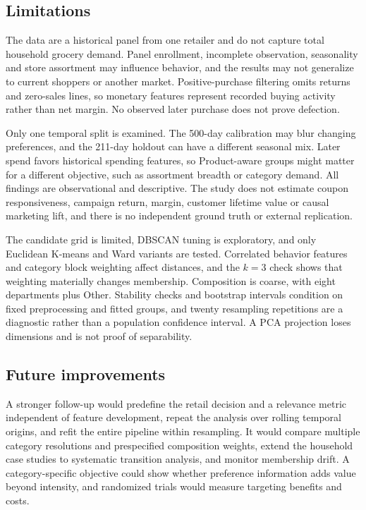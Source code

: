 \subsection{Limitations}
The data are a historical panel from one retailer and do not capture total household grocery demand. Panel enrollment, incomplete observation, seasonality and store assortment may influence behavior, and the results may not generalize to current shoppers or another market. Positive-purchase filtering omits returns and zero-sales lines, so monetary features represent recorded buying activity rather than net margin. No observed later purchase does not prove defection.

Only one temporal split is examined. The 500-day calibration may blur changing preferences, and the 211-day holdout can have a different seasonal mix. Later spend favors historical spending features, so Product-aware groups might matter for a different objective, such as assortment breadth or category demand. All findings are observational and descriptive. The study does not estimate coupon responsiveness, campaign return, margin, customer lifetime value or causal marketing lift, and there is no independent ground truth or external replication.

The candidate grid is limited, DBSCAN tuning is exploratory, and only Euclidean K-means and Ward variants are tested. Correlated behavior features and category block weighting affect distances, and the $k=3$ check shows that weighting materially changes membership. Composition is coarse, with eight departments plus Other. Stability checks and bootstrap intervals condition on fixed preprocessing and fitted groups, and twenty resampling repetitions are a diagnostic rather than a population confidence interval. A PCA projection loses dimensions and is not proof of separability.

\subsection{Future improvements}
A stronger follow-up would predefine the retail decision and a relevance metric independent of feature development, repeat the analysis over rolling temporal origins, and refit the entire pipeline within resampling. It would compare multiple category resolutions and prespecified composition weights, extend the household case studies to systematic transition analysis, and monitor membership drift. A category-specific objective could show whether preference information adds value beyond intensity, and randomized trials would measure targeting benefits and costs.

